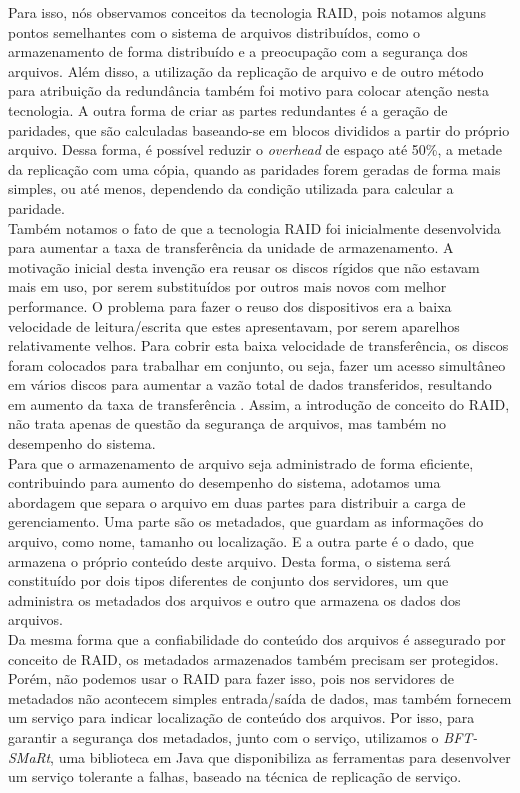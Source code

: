 	
	Para isso, nós observamos conceitos da tecnologia RAID, pois notamos alguns pontos semelhantes com o sistema de arquivos distribuídos, como o armazenamento de forma distribuído e a preocupação com a segurança dos arquivos.
	Além disso, a utilização da replicação de arquivo e de outro método para atribuição da redundância também foi motivo para colocar atenção nesta tecnologia.
	A outra forma de criar as partes redundantes é a geração de paridades, que são calculadas baseando-se em blocos divididos a partir do próprio arquivo.
	Dessa forma, é possível reduzir o \textit{overhead} de espaço até 50\%, a metade da replicação com uma cópia, quando as paridades forem geradas de forma mais simples, ou até menos, dependendo da condição utilizada para calcular a paridade.
	\\
	
	Também notamos o fato de que a tecnologia RAID foi inicialmente desenvolvida para aumentar a taxa de transferência da unidade de armazenamento.
	A motivação inicial desta invenção era reusar os discos rígidos que não estavam mais em uso, por serem substituídos por outros mais novos com melhor performance.
	O problema para fazer o reuso dos dispositivos era a baixa velocidade de leitura/escrita que estes apresentavam, por serem aparelhos relativamente velhos. 
	Para cobrir esta baixa velocidade de transferência, os discos foram colocados para trabalhar em conjunto, ou seja, fazer um acesso simultâneo em vários discos para aumentar a vazão total de dados transferidos, resultando em aumento da taxa de transferência .
	Assim, a introdução de conceito do RAID, não trata apenas de questão da segurança de arquivos, mas também no desempenho do sistema.  
	\\
	
	Para que o armazenamento de arquivo seja administrado de forma eficiente, contribuindo para aumento do desempenho do sistema, adotamos uma abordagem que separa o arquivo em duas partes para distribuir a carga de gerenciamento. 
	Uma parte são os metadados, que guardam as informações do arquivo, como nome, tamanho ou localização. E a outra parte é o dado, que armazena o próprio conteúdo deste arquivo. 
	Desta forma, o sistema será constituído por dois tipos diferentes de conjunto dos servidores, um que administra os metadados dos arquivos e outro que armazena os dados dos arquivos. 
	\\
	
	Da mesma forma que a confiabilidade do conteúdo dos arquivos é assegurado por conceito de RAID, os metadados armazenados também precisam ser protegidos.
	Porém, não podemos usar o RAID para fazer isso, pois nos servidores de metadados não acontecem simples entrada/saída de dados, mas também fornecem um serviço para indicar localização de conteúdo dos arquivos. 
	Por isso, para garantir a segurança dos metadados, junto com o serviço, utilizamos o \textit{BFT-SMaRt}, uma biblioteca em Java que disponibiliza as ferramentas para desenvolver um serviço tolerante a falhas, baseado na técnica de replicação de serviço.
	\\	
	
